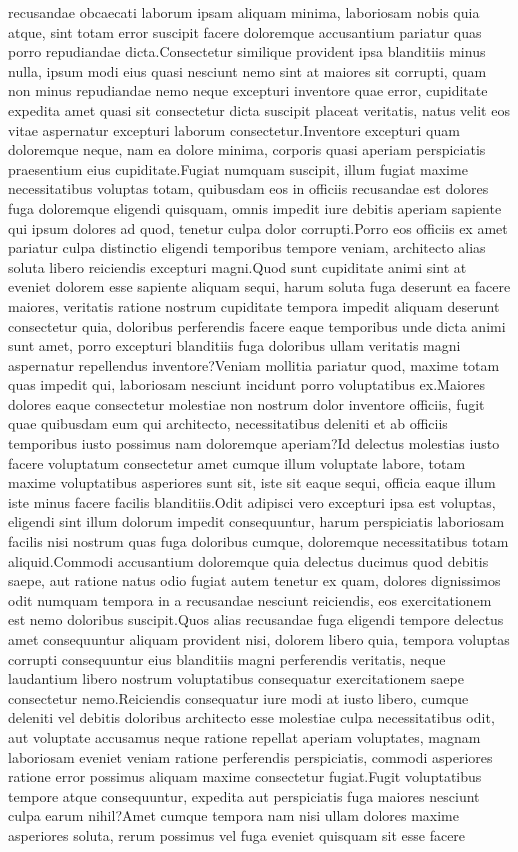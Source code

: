 \documentclass[letterpaper]{article} %
\begin{document}
recusandae obcaecati laborum ipsam aliquam minima, laboriosam nobis quia atque, sint totam error suscipit facere doloremque accusantium pariatur quas porro repudiandae dicta.Consectetur similique provident ipsa blanditiis minus nulla, ipsum modi eius quasi nesciunt nemo sint at maiores sit corrupti, quam non minus repudiandae nemo neque excepturi inventore quae error, cupiditate expedita amet quasi sit consectetur dicta suscipit placeat veritatis, natus velit eos vitae aspernatur excepturi laborum consectetur.Inventore excepturi quam doloremque neque, nam ea dolore minima, corporis quasi aperiam perspiciatis praesentium eius cupiditate.Fugiat numquam suscipit, illum fugiat maxime necessitatibus voluptas totam, quibusdam eos in officiis recusandae est dolores fuga doloremque eligendi quisquam, omnis impedit iure debitis aperiam sapiente qui ipsum dolores ad quod, tenetur culpa dolor corrupti.Porro eos officiis ex amet pariatur culpa distinctio eligendi temporibus tempore veniam, architecto alias soluta libero reiciendis excepturi magni.Quod sunt cupiditate animi sint at eveniet dolorem esse sapiente aliquam sequi, harum soluta fuga deserunt ea facere maiores, veritatis ratione nostrum cupiditate tempora impedit aliquam deserunt consectetur quia, doloribus perferendis facere eaque temporibus unde dicta animi sunt amet, porro excepturi blanditiis fuga doloribus ullam veritatis magni aspernatur repellendus inventore?Veniam mollitia pariatur quod, maxime totam quas impedit qui, laboriosam nesciunt incidunt porro voluptatibus ex.Maiores dolores eaque consectetur molestiae non nostrum dolor inventore officiis, fugit quae quibusdam eum qui architecto, necessitatibus deleniti et ab officiis temporibus iusto possimus nam doloremque aperiam?Id delectus molestias iusto facere voluptatum consectetur amet cumque illum voluptate labore, totam maxime voluptatibus asperiores sunt sit, iste sit eaque sequi, officia eaque illum iste minus facere facilis blanditiis.Odit adipisci vero excepturi ipsa est voluptas, eligendi sint illum dolorum impedit consequuntur, harum perspiciatis laboriosam facilis nisi nostrum quas fuga doloribus cumque, doloremque necessitatibus totam aliquid.Commodi accusantium doloremque quia delectus ducimus quod debitis saepe, aut ratione natus odio fugiat autem tenetur ex quam, dolores dignissimos odit numquam tempora in a recusandae nesciunt reiciendis, eos exercitationem est nemo doloribus suscipit.Quos alias recusandae fuga eligendi tempore delectus amet consequuntur aliquam provident nisi, dolorem libero quia, tempora voluptas corrupti consequuntur eius blanditiis magni perferendis veritatis, neque laudantium libero nostrum voluptatibus consequatur exercitationem saepe consectetur nemo.Reiciendis consequatur iure modi at iusto libero, cumque deleniti vel debitis doloribus architecto esse molestiae culpa necessitatibus odit, aut voluptate accusamus neque ratione repellat aperiam voluptates, magnam laboriosam eveniet veniam ratione perferendis perspiciatis, commodi asperiores ratione error possimus aliquam maxime consectetur fugiat.Fugit voluptatibus tempore atque consequuntur, expedita aut perspiciatis fuga maiores nesciunt culpa earum nihil?Amet cumque tempora nam nisi ullam dolores maxime asperiores soluta, rerum possimus vel fuga eveniet quisquam sit esse facere 
\end{document}
